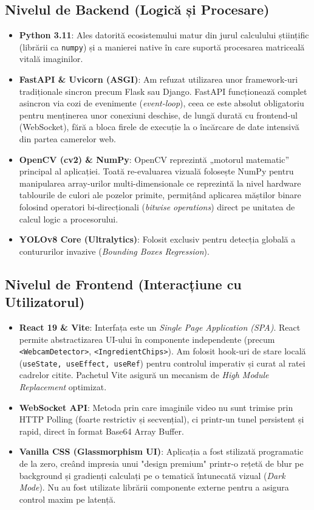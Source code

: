 \documentclass[12pt,a4paper]{article}
\begin{document}
\subsection{Nivelul de Backend (Logică și Procesare)}
\begin{itemize}
    \item \textbf{Python 3.11}: Ales datorită ecosistemului matur din jurul calculului științific (librării ca \texttt{numpy}) și a manierei native în care suportă procesarea matriceală vitală imaginilor.
    \item \textbf{FastAPI \& Uvicorn (ASGI)}: Am refuzat utilizarea unor framework-uri tradiționale sincron precum Flask sau Django. FastAPI funcționează complet asincron via cozi de evenimente (\textit{event-loop}), ceea ce este absolut obligatoriu pentru menținerea unor conexiuni deschise, de lungă durată cu frontend-ul (WebSocket), fără a bloca firele de execuție la o încărcare de date intensivă din partea camerelor web.
    \item \textbf{OpenCV (cv2) \& NumPy}: OpenCV reprezintă „motorul matematic” principal al aplicației. Toată re-evaluarea vizuală folosește NumPy pentru manipularea array-urilor multi-dimensionale ce reprezintă la nivel hardware tablourile de culori ale pozelor primite, permițând aplicarea măștilor binare folosind operatori bi-direcționali (\textit{bitwise operations}) direct pe unitatea de calcul logic a procesorului.
    \item \textbf{YOLOv8 Core (Ultralytics)}: Folosit exclusiv pentru detecția globală a contururilor invazive (\textit{Bounding Boxes Regression}).
\end{itemize}

\subsection{Nivelul de Frontend (Interacțiune cu Utilizatorul)}
\begin{itemize}
    \item \textbf{React 19 \& Vite}: Interfața este un \textit{Single Page Application (SPA)}. React permite abstractizarea UI-ului în componente independente (precum \texttt{<WebcamDetector>}, \texttt{<IngredientChips>}). Am folosit hook-uri de stare locală (\texttt{useState, useEffect, useRef}) pentru controlul imperativ și curat al ratei cadrelor citite. Pachetul Vite asigură un mecanism de \textit{High Module Replacement} optimizat.
    \item \textbf{WebSocket API}: Metoda prin care imaginile video nu sunt trimise prin HTTP Polling (foarte restrictiv și secvențial), ci printr-un tunel persistent și rapid, direct în format Base64 Array Buffer.
    \item \textbf{Vanilla CSS (Glassmorphism UI)}: Aplicația a fost stilizată programatic de la zero, creând impresia unui "design premium" printr-o rețetă de blur pe background și gradienți calculați pe o tematică întunecată vizual (\textit{Dark Mode}). Nu au fost utilizate librării componente externe pentru a asigura control maxim pe latență.
\end{itemize}
\end{document}
